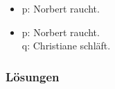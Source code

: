 {\begin{frame}
\begin{table}
\begin{minipage}{0.4\textwidth}
\centering
\begin{itemize}
\item[] \small{p: Norbert raucht.}
\end{itemize}
\end{minipage}
%
\begin{minipage}{0.5\textwidth}
\centering
\begin{itemize}
\item[] \small{p: Norbert raucht.\\
q: Christiane schläft.}
\end{itemize}
\end{minipage}
\end{table}

\end{frame}

%

\begin{frame}
\frametitle{Lösungen}

\begin{table}


\end{table}
\end{frame}}
